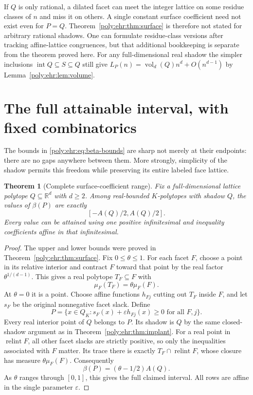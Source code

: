 \documentclass[11pt,a4paper]{article}
\numberwithin{equation}{section}
\newtheorem{theorem}{Theorem}[section]
\theoremstyle{plain}
\newcommand{\R}{\mathbb R}
\newcommand{\eps}{\varepsilon}
\newcommand{\relint}{\operatorname{relint}}
\newcommand{\intr}{\operatorname{int}}
\newcommand{\vol}{\operatorname{vol}}
\begin{document}
\begin{remark}
If $Q$ is only rational, a dilated facet can meet the integer lattice on
some residue classes of $n$ and miss it on others. A single constant
surface coefficient need not exist even for $P=Q$. Theorem~\ref{poly:ehr:thm:surface}
is therefore not stated for arbitrary rational shadows. One can formulate
residue-class versions after tracking affine-lattice congruences, but
that additional bookkeeping is separate from the theorem proved here.
For any full-dimensional real shadow the simpler inclusions
$\intr Q\subseteq S\subseteq Q$ still give
$L_P(n)=\vol_d(Q)n^d+O(n^{d-1})$ by Lemma~\ref{poly:ehr:lem:volume}.
\end{remark}

\section{The full attainable interval, with fixed combinatorics}
\label{poly:ehr:sec:interval}

The bounds in \eqref{poly:ehr:eq:beta-bounds} are sharp not merely at their endpoints:
there are no gaps anywhere between them. More strongly, simplicity of the
shadow permits this freedom while preserving its entire labeled face lattice.

\begin{theorem}[Complete surface-coefficient range]\label{poly:ehr:thm:range}
Fix a full-dimensional lattice polytope $Q\subseteq\R^d$ with $d\geq2$.
Among real-bounded $K$-polytopes with shadow $Q$, the values of $\beta(P)$
are exactly
\[
 [-A(Q)/2,A(Q)/2].
\]
Every value can be attained using one positive infinitesimal and inequality
coefficients affine in that infinitesimal.
\end{theorem}
\begin{proof}
The upper and lower bounds were proved in Theorem~\ref{poly:ehr:thm:surface}.
Fix $0\leq\theta\leq1$. For each facet $F$, choose a point in its relative
interior and contract $F$ toward that point by the real factor
$\theta^{1/(d-1)}$. This gives a real polytope $T_F\subseteq F$ with
\[
 \mu_F(T_F)=\theta\mu_F(F).
\]
At $\theta=0$ it is a point. Choose affine functions $h_{Fj}$ cutting out
$T_F$ inside $F$, and let $s_F$ be the original nonnegative facet slack.
Define
\[
 P=\{x\in Q_K:s_F(x)+\eps h_{Fj}(x)\geq0
                         \text{ for all }F,j\}.
\]
Every real interior point of $Q$ belongs to $P$. Its shadow is $Q$ by the
same closed-shadow argument as in Theorem~\ref{poly:ehr:thm:implant}. For a real
point in $\relint F$, all other facet slacks are strictly positive, so only
the inequalities associated with $F$ matter. Its trace there is exactly
$T_F\cap\relint F$, whose closure has measure $\theta\mu_F(F)$.
Consequently
\[
 \beta(P)=(\theta-1/2)A(Q).
\]
As $\theta$ ranges through $[0,1]$, this gives the full claimed interval.
All rows are affine in the single parameter $\eps$.
\end{proof}
\end{document}
